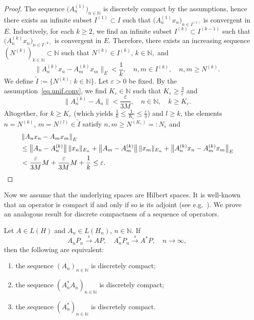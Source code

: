 \documentclass[a4paper,reqno]{amsart}
\begin{document}
{\begin{proof}
 The sequence $\big(A_n^{(1)}\big)_{n\in{\mathbb{N}}}$ is discretely compact by the assumptions, hence there exists an infinite subset $I^{(1)}\subset I$ such that 
 $\big(A_n^{(1)}x_n\big)_{n\in I^{(1)}}$ is convergent in $E$. 
Inductively, for each $k\geq 2$, we find  an infinite subset $I^{(k)}\subset I^{(k-1)}$ such that  
 $\big(A_n^{(k)}x_n\big)_{n\in I^{(k)}}$ is convergent in $E$. Therefore, there exists an increasing sequence $(N^{(k)})_{k\in{\mathbb{N}}}\subset{\mathbb{N}}$ such that $N^{(k)}\in I^{(k)}, \,k\in{\mathbb{N}},$ and
 $$\big\|A_n^{(k)}x_n-A_m^{(k)}x_m\big\|_{E}<\frac{1}{k}, \quad n,m\in I^{(k)},\quad n,m\geq N^{(k)}.$$
 We define $\widetilde I:=\big\{N^{(k)}:\,k\in{\mathbb{N}}\big\}.$
 Let $\varepsilon>0$ be fixed.  
By the assumption~\eqref{eq.unif.conv}, we find $K_\varepsilon\in{\mathbb{N}}$ such that $K_\varepsilon\geq\frac{3}\varepsilon$ and  
 $$\big\|A_n^{(k)}-A_n\big\|<\frac\varepsilon{3M}, \quad n\in{\mathbb{N}}, \quad k\geq K_\varepsilon.$$
 Altogether, for $k\geq K_\varepsilon$ (which yields $\frac{1}{k}\leq \frac{1}{K_\varepsilon}\leq\frac \varepsilon{3}$) and $l\geq k$, the elements $n=N^{(k)}$, $m=N^{(l)}\in\widetilde I$ satisfy $n,m\geq N^{(K_\varepsilon)}=:N_\varepsilon$ and
 \begin{align*}
 &\left\|A_{n}x_{n}-A_{m}x_{m}\right\|_{E}\\
 &\leq \big\|A_{n}-A_{n}^{(k)}\big\|\,\|x_{n}\|_{E_n}+\big\|A_{m}-A_{m}^{(k)}\big\|\,\|x_{m}\|_{E_n} +\big\|A_{n}^{(k)}x_{n}-A_{m}^{(k)}x_{m}\big\|_{E}\\
 &< \frac\varepsilon{3M}M+\frac\varepsilon{3M}M+\frac{1}{k}\leq \varepsilon.
\qedhere
 \end{align*}
\end{proof}

Now we assume that the underlying spaces are Hilbert spaces.
It is well-known that an operator is compact if and only if so is its adjoint (see e.g.\ \cite[Theorem~III.4.10]{kato}).
We prove an analogous result for discrete compactness of a sequence of operators.
\begin{prop}\label{propdisccompofadj}
 Let 
$A\in L(H)$ and $A_n\in L(H_n)$, $n\in{\mathbb{N}}$.
If
$$A_nP_n{\stackrel{s}{\longrightarrow}} AP, \quad A_n^*P_n {\stackrel{s}{\longrightarrow}} A^*P ,\quad n\to\infty,$$ 
then the following are equivalent:
\begin{enumerate}[label=\rm{\roman{*})}]
 \item the sequence $\left(A_n\right)_{n\in{\mathbb{N}}}$ is discretely compact;
 \item the sequence $\left(A_n^*A_n\right)_{n\in{\mathbb{N}}}$ is discretely compact;
 \item the sequence $\left(A_n^*\right)_{n\in{\mathbb{N}}}$ is discretely compact.
\end{enumerate}
\end{prop}

}
\end{document}
